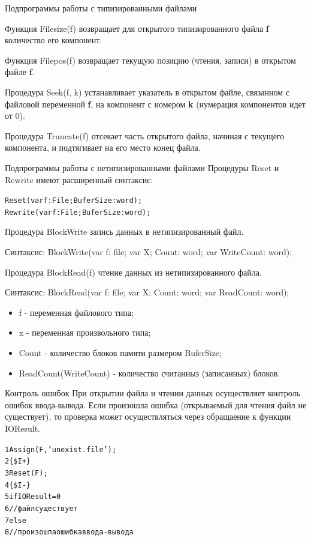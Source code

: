 \documentclass{beamer}
\begin{document}
\begin{frame}{Подпрограммы работы с типизированными файлами}
\begin{block}{Функция Filesize(f)}
возвращает для открытого типизированного файла \textbf{f} количество его компонент.
\end{block}
\begin{block}{Функция Filepos(f)}
возвращает текущую позицию (чтения, записи) в открытом файле \textbf{f}.
\end{block}
\begin{block}{Процедура Seek(f, k)}
устанавливает указатель в открытом файле, связанном с файловой переменной \textbf{f}, на компонент с номером \textbf{k} (нумерация компонентов идет от 0).
\end{block}
\begin{block}{Процедура Truncate(f)}
отсекает часть открытого файла, начиная с текущего компонента, и подтягивает на его место
конец файла.
\end{block}
\end{frame}

\begin{frame}[fragile]{Подпрограммы работы с нетипизированными файлами}
Процедуры Reset и Rewrite имеют расширенный синтаксис:
\begin{alltt}
Reset(var f: File; BuferSize: word);
Rewrite(var f: File; BuferSize: word) ;
\end{alltt}
\begin{block}{Процедура BlockWrite}
запись данных в нетипизированный файл.
\end{block}
Синтаксис: BlockWrite(var f: file; var X; Count: word; var WriteCount: word);
\begin{block}{Процедура BlockRead(f)}
чтение данных из нетипизированного файла.
\end{block}
Синтаксис: BlockRead(var f: file; var X; Count: word; var ReadCount: word);
\begin{itemize}
\item f - переменная файлового типа;
\item x - переменная произвольного типа;
\item Count - количество блоков памяти размером BuferSize;
\item ReadCount(WriteCount) - количество считанныз (записанных) блоков.
\end{itemize}
\end{frame}

\begin{frame}[fragile]{Контроль ошибок}
При открытии файла и чтении данных осуществляет контроль ошибок ввода-вывода. Если произошла ошибка (открываемый для чтения файл не существует), то проверка может осуществляться через обращаение к функции IOResult.
\begin{alltt}
 1 Assign(F, 'unexist.file');
 2 \{\$I+\}
 3 Reset(F);
 4 \{\$I-\} 
 5 if IOResult = 0
 6 //файл существует 
 7 else
 8 //произошла ошибка ввода-вывода
\end{alltt}
\end{frame}
\end{document}
